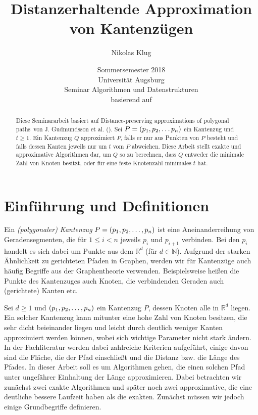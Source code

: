\documentclass[11pt]{article}
\title{Distanzerhaltende Approximation von Kantenzügen}
\author{Nikolas Klug}
\date{Sommersemester 2018
	\\ Universität Augsburg
	\\ Seminar Algorithmen und Datenstrukturen
	\\ basierend auf \cite{gudmundsson}}
\newcommand{\R}{\mathbb{R}}
\begin{document}
    \maketitle

    \begin{abstract}
        Diese Seminararbeit basiert auf \glqq Distance-preserving approximations of polygonal paths\grqq\ von J. Gudmundsson et al. (\cite{gudmundsson}). Sei $P = (p_1, p_2, \mathellipsis p_n)$ ein Kantenzug und $t \geq 1$. Ein Kantenzug $Q$ approximiert $P$, falls er nur aus Punkten von $P$ besteht und falls dessen Kanten jeweils nur um $t$ vom $P$ abweichen. Diese Arbeit stellt exakte und approximative Algorithmen dar, um $Q$ so zu berechnen, dass $Q$ entweder die minimale Zahl von Knoten besitzt, oder für eine feste Knotenzahl 
        minimales $t$ hat.
    \end{abstract}

    \section{Einführung und Definitionen}
    \label{sec:intro}

	Ein \emph{(polygonaler) Kantenzug} $P = (p_1, p_2, \mathellipsis, p_n)$ ist eine Aneinanderreihung von Geradensegmenten, die für $1 \leq i < n$ jeweils $p_i$ und $p_{i+1}$ verbinden. Bei den $p_i$ handelt es sich dabei um Punkte aus dem $\R^d$ (für $d \in \mathbb{N}$). Aufgrund der starken Ähnlichkeit zu gerichteten Pfaden in Graphen, werden wir für Kantenzüge auch häufig Begriffe aus der Graphentheorie verwenden. Beispielsweise heißen die Punkte des Kantenzuges  auch Knoten, die verbindenden Geraden auch (gerichtete) Kanten etc.

    Sei $d\geq1$ und $(p_1, p_2, \mathellipsis, p_n)$ ein Kantenzug $P$, dessen Knoten alle in $\R^{d}$ liegen.
    Ein solcher Kantenzug kann mitunter eine hohe Zahl von Knoten besitzen, die sehr dicht beieinander liegen und leicht durch deutlich weniger Kanten approximiert werden können, wobei sich wichtige Parameter nicht stark ändern. In der Fachliteratur werden dabei zahlreiche Kriterien aufgeführt, einige davon sind die Fläche, die der Pfad einschließt und die Distanz bzw. die Länge des Pfades. In dieser Arbeit soll es um Algorithmen gehen, die einen solchen Pfad unter ungefährer Einhaltung der Länge approximieren. Dabei betrachten wir zunächst zwei exakte Algorithmen und später noch zwei approximative, die eine deutliche bessere Laufzeit haben als die exakten. Zunächst müssen wir jedoch einige Grundbegriffe definieren.
   
\end{document}
